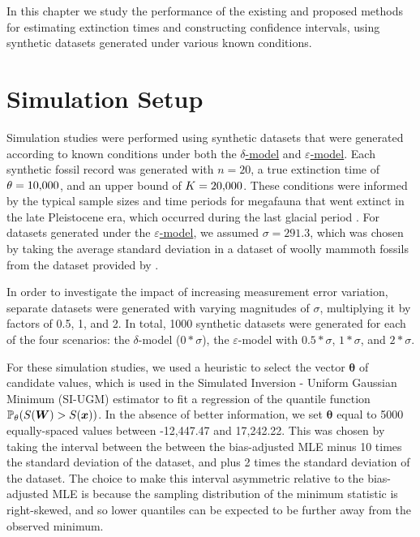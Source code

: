 
In this chapter we study the performance of the existing and proposed methods for estimating extinction times and constructing confidence intervals, using synthetic datasets generated under various known conditions.

\section{Simulation Setup}

Simulation studies were performed using synthetic datasets that were generated according to known conditions under both the \hyperref[model: no-measurement-error]{$\delta$-model} and \hyperref[model: measurement-error]{$\varepsilon$-model}. Each synthetic fossil record was generated with $n=20$, a true extinction time of $\theta = 10{\small,}000$, and an upper bound of $K = 20{\small,}000$. These conditions were informed by the typical sample sizes and time periods for megafauna that went extinct in the late Pleistocene era, which occurred during the last glacial period \cite{Cooper2015}. For datasets generated under the \hyperref[model: measurement-error]{$\varepsilon$-model}, we assumed $\sigma = 291.3$, which was chosen by taking the average standard deviation in a dataset of woolly mammoth fossils from the dataset provided by \citet{Cooper2015}.

In order to investigate the impact of increasing measurement error variation, separate datasets were generated with varying magnitudes of $\sigma$, multiplying it by factors of 0.5, 1, and 2. In total, 1000 synthetic datasets were generated for each of the four scenarios: the $\delta$-model ($0*\sigma$), the $\varepsilon$-model with $0.5*\sigma$, $1*\sigma$, and $2*\sigma$. 

For these simulation studies, we used a heuristic to select the vector $\bm{\theta}$ of candidate values, which is used in the Simulated Inversion - Uniform Gaussian Minimum (SI-UGM) estimator to fit a regression of the quantile function $\mathbb{P}_\theta (S(\bm{W}) > S(\bm{x}))$. In the absence of better information, we set $\bm{\theta}$ equal to 5000 equally-spaced values between -12{\small,}447.47 and 17{\small,}242.22. This was chosen by taking the interval between the between the bias-adjusted MLE minus 10 times the standard deviation of the dataset, and plus 2 times the standard deviation of the dataset. The choice to make this interval asymmetric relative to the bias-adjusted MLE is because the sampling distribution of the minimum statistic is right-skewed, and so lower quantiles can be expected to be further away from the observed minimum.

